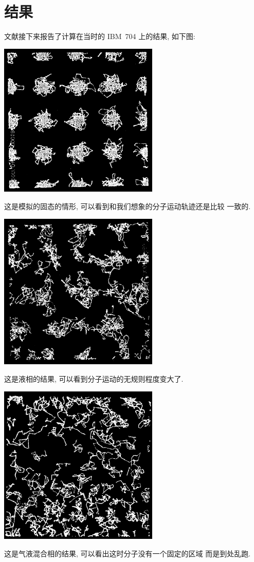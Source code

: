 \documentclass{ctexart}
\begin{document}
\section{结果}
文献接下来报告了计算在当时的 IBM~704 上的结果, 如下图:
\begin{center}
\includegraphics[width=3in]{res1.png}
\end{center}
这是模拟的固态的情形, 可以看到和我们想象的分子运动轨迹还是比较
一致的.
\begin{center}
\includegraphics[width=3in]{res2.png}
\end{center}
这是液相的结果, 可以看到分子运动的无规则程度变大了.
\begin{center}
\includegraphics[width=3in]{res3.png}
\end{center}
这是气液混合相的结果, 可以看出这时分子没有一个固定的区域
而是到处乱跑.
\end{document}
